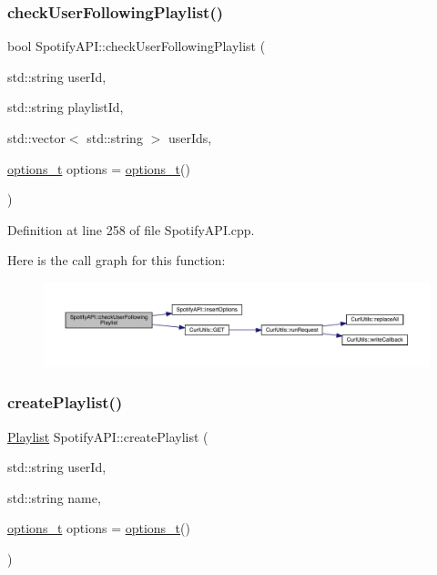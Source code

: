 \subsubsection{\texorpdfstring{check\+User\+Following\+Playlist()}{checkUserFollowingPlaylist()}}
{\footnotesize\ttfamily bool Spotify\+A\+P\+I\+::check\+User\+Following\+Playlist (\begin{DoxyParamCaption}\item[{std\+::string}]{user\+Id,  }\item[{std\+::string}]{playlist\+Id,  }\item[{std\+::vector$<$ std\+::string $>$}]{user\+Ids,  }\item[{\mbox{\hyperlink{_spotify_a_p_i_8h_a0ff5cac1a4007bb330b7d9939650c283}{options\+\_\+t}}}]{options = {\ttfamily \mbox{\hyperlink{_spotify_a_p_i_8h_a0ff5cac1a4007bb330b7d9939650c283}{options\+\_\+t}}()} }\end{DoxyParamCaption})}



Definition at line 258 of file Spotify\+A\+P\+I.\+cpp.

Here is the call graph for this function\+:
\nopagebreak
\begin{figure}[H]
\begin{center}
\leavevmode
\includegraphics[width=350pt]{class_spotify_a_p_i_a7eb589d3b0696f9c9cf4a196cef1c627_cgraph}
\end{center}
\end{figure}
\mbox{\label{class_spotify_a_p_i_a1ac0dc243fd741bc5141b5cb275d5ff1}} 
\subsubsection{\texorpdfstring{create\+Playlist()}{createPlaylist()}}
{\footnotesize\ttfamily \mbox{\hyperlink{class_playlist}{Playlist}} Spotify\+A\+P\+I\+::create\+Playlist (\begin{DoxyParamCaption}\item[{std\+::string}]{user\+Id,  }\item[{std\+::string}]{name,  }\item[{\mbox{\hyperlink{_spotify_a_p_i_8h_a0ff5cac1a4007bb330b7d9939650c283}{options\+\_\+t}}}]{options = {\ttfamily \mbox{\hyperlink{_spotify_a_p_i_8h_a0ff5cac1a4007bb330b7d9939650c283}{options\+\_\+t}}()} }\end{DoxyParamCaption})}



